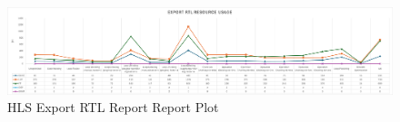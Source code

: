 \begin{figure}[H]
    \centering
    \includegraphics[width=0.9\textheight, angle=90]{conclusions/hlsexportrtl.png}
    \caption{HLS Export RTL Report Report Plot}
    \label{fig:hls-synthesis-export-rtl-plot}
\end{figure}